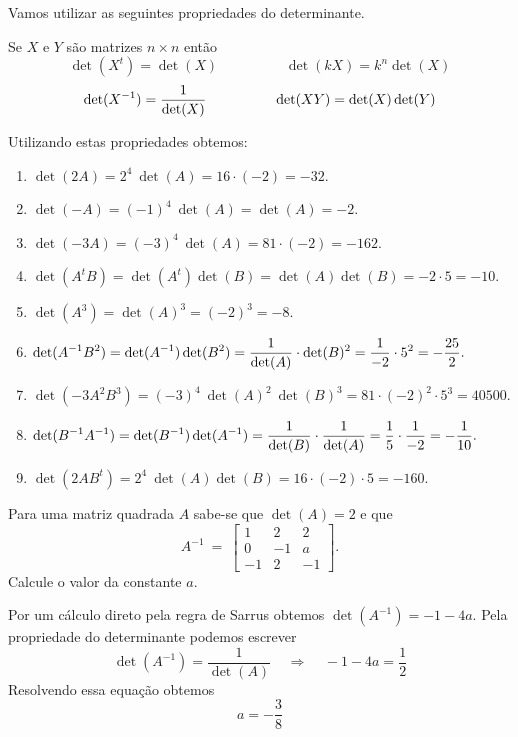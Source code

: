 \begin{solution}
Vamos utilizar as seguintes propriedades do determinante.

\medskip
Se $X$ e $Y$ são matrizes $n \times n$ então
$$\det(X^t) = \det(X)               \hspace{2cm}     \det(k X) = k^n \det(X)$$
$$\det(X^{-1}) = \frac{1}{\det(X)}  \hspace{1.7cm}  \det(X Y) = \det(X) \det(Y)$$

\medskip
Utilizando estas propriedades obtemos:
\begin{enumerate}
\item[(a)] $\det(2A) = 2^4 \ \det(A) = 16 \cdot (-2) = -32.$

\item[(b)] $\det(-A) = (-1)^4\ \det(A) = \det(A) = -2$.

\item[(c)] $\det(-3A) = (-3)^4\  \det(A) = 81 \cdot (-2) = -162.$

\item[(d)] $\det(A^{t}B) = \det(A^{t}) \det(B) = \det(A) \det(B) = -2 \cdot 5 = -10.$ 

\item[(e)] $\det(A^3) = \det(A)^3 = (-2)^3 = -8.$

\item[(f)] $\displaystyle \det(A^{-1}B^2) = \det(A^{-1}) \det(B^2) = \dfrac{1}{\det(A)}\cdot \det(B)^2 = \dfrac{1}{-2} \cdot 5^2 = -\dfrac{25}{2}.$ 

\item[(g)] $\det(-3A^2B^3) = (-3)^4 \ \det(A)^2 \ \det(B)^3 = 81 \cdot (-2)^2 \cdot 5^3 = 40500.$

\item[(h)] $\displaystyle \det(B^{-1}A^{-1}) = \det(B^{-1}) \det(A^{-1}) = \dfrac{1}{\det(B)} \cdot \dfrac{1}{\det(A)} =
\dfrac{1}{5} \cdot \dfrac{1}{-2} = -\dfrac{1}{10}.$

\item[(i)] $\det(2AB^t) = 2^4 \ \det(A) \det(B) = 16 \cdot (-2) \cdot 5 = -160.$
\end{enumerate}
\end{solution}


\begin{problem}
Para uma matriz quadrada $A$ sabe-se que $\det(A) = 2$ e que 
$$A^{-1}\ =\ \left[\begin{array}{rrr} 1  &  2  &  2  \\
                                      0  & -1  &  a  \\
                                     -1  &  2  & -1  \end{array}\right].$$
Calcule o valor da constante $a$.
\end{problem}
\begin{solution}
Por um cálculo direto pela regra de Sarrus obtemos $\det(A^{-1}) = -1-4a$. 
Pela propriedade do determinante podemos escrever 
$$\det(A^{-1}) = \frac{1}{\det(A)}\ \ \ \ \ \Rightarrow \ \ \ \ \ -1-4a = \dfrac{1}{2}$$
Resolvendo essa equação obtemos
$$a = -\dfrac{3}{8}$$
\end{solution}

